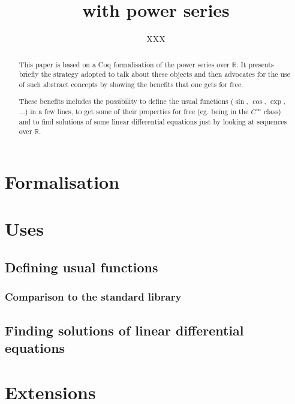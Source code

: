 \documentclass[submission,copyright]{eptcs}
\title{\coq{} with power series}
\author{XXX
\institute{Junior Laboratory \coqtail{}\\
Ens Lyon - France\\}
\email{XXX}}
\newcommand{\coq}{Coq}
\newcommand{\R}{$\mathbb{R}$}
\begin{document}
\maketitle

\begin{abstract}
This paper is based on a \coq{} formalisation of the power series over \R{}. It
presents briefly the strategy adopted to talk about these objects and then
advocates for the use of such abstract concepts by showing the benefits that
one gets for free.

These benefits includes the possibility to define the usual functions ($\sin$,
$\cos$, $\exp$, ...) in a few lines, to get some of their properties for free
(eg. being in the $C^{\infty}$ class) and to find solutions of some linear
differential equations just by looking at sequences over \R{}.

\end{abstract}

\section{Formalisation}

\section{Uses}
\subsection{Defining usual functions}
\subsubsection{Comparison to the standard library}

\subsection{Finding solutions of linear differential equations}

\section{Extensions}
\end{document}
